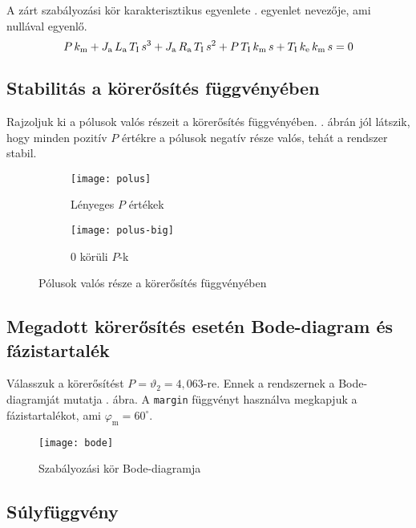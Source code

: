 A zárt szabályozási kör karakterisztikus egyenlete . egyenlet nevezője, 
ami nullával egyenlő.
\begin{equation}
	P\, k_\text{m} + J_\text{a}\, L_\text{a}\, T_\text{I}\, s^3 + J_\text{a}\, R_\text{a}\, T_\text{I}\, s^2 + P\, T_\text{I}\, k_\text{m}\, s + T_\text{I}\, k_\text{e}\, k_\text{m}\, s = 0
\end{equation}

\subsection{Stabilitás a körerősítés függvényében}

Rajzoljuk ki a pólusok valós részeit a körerősítés függvényében.
. ábrán jól látszik, hogy minden pozitív $P$ értékre a pólusok
negatív része valós, tehát a rendszer stabil.
\begin{figure}[H]
	\centering
	\begin{subfigure}{.49\textwidth}
		\texttt{[image: polus]}
		\caption{Lényeges $P$ értékek}
	\end{subfigure}
	\begin{subfigure}{.49\textwidth}
		\texttt{[image: polus-big]}
		\caption{0 körüli $P$-k}
	\end{subfigure}
	\caption{Pólusok valós része a körerősítés függvényében}
	\label{fig:poles}
\end{figure}


\subsection{Megadott körerősítés esetén Bode-diagram és fázistartalék}

Válasszuk a körerősítést $P=\vartheta_2 = 4,063$-re.
Ennek a rendszernek a Bode-diagramját mutatja . ábra.
A \verb|margin| függvényt használva megkapjuk a fázistartalékot,
ami $\varphi_\text{m}=60^\circ$.

\begin{figure}[H]
	\centering
	\texttt{[image: bode]}
	\caption{Szabályozási kör Bode-diagramja}
	\label{fig:bode}
\end{figure}


\subsection{Súlyfüggvény}


